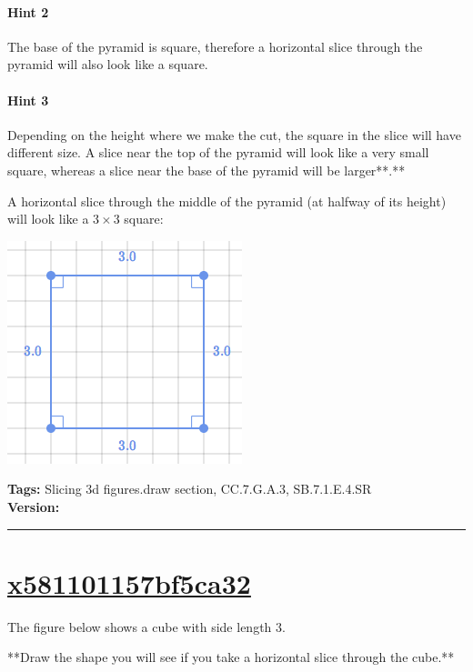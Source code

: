 \documentclass[twocolumn,10pt]{article}
\def\shrinkfactor{0.4}
\begin{document}
\paragraph{Hint 2}The base of the pyramid is square, therefore a horizontal slice through the pyramid will also look like a square.

\paragraph{Hint 3}Depending on the height where we make the cut, the square in the slice will have different size. A slice near the top of the pyramid will look like a very small square, whereas a slice near the base of the pyramid will be larger**.**

A horizontal slice through the middle of the pyramid (at halfway of its height) will look like a $3 \times 3$ square:    

\includegraphics[scale=\shrinkfactor]{figures/339319c697846538f4f62770f5fc3cc189f26e88.png}



\medskip
\noindent
\textbf{Tags:} {\footnotesize Slicing 3d figures.draw section, CC.7.G.A.3, SB.7.1.E.4.SR}\\
\textbf{Version:} \DIFdelbegin {}\DIFdelend \DIFaddbegin {}\DIFaddend \smallskip\hrule





\section{\href{https://www.khanacademy.org/devadmin/content/items/x581101157bf5ca32}{x581101157bf5ca32}}

\noindent
The figure below shows a cube with side length $3$.   

**Draw the shape you will see if you take a horizontal slice through the cube.**
\end{document}
